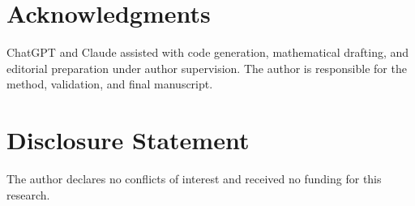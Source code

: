 \documentclass[10pt,journal]{IEEEtran}
\theoremstyle{bodysmall}
\theoremstyle{remark}
\begin{document}











\FloatBarrier

\section*{Acknowledgments}
ChatGPT and Claude assisted with code generation, mathematical drafting, and editorial preparation under author supervision. The author is responsible for the method, validation, and final manuscript.

\section*{Disclosure Statement}
The author declares no conflicts of interest and received no funding for this research.

\nocite{Kalman1960_Filtering,Jazwinski1970_Filtering,Maybeck1979_StochasticModels,Markley2003AttitudeError,UhlenbeckOrnstein1930_OU}


\end{document}

